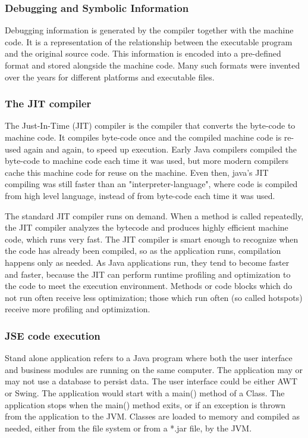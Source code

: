 \documentclass{article}
\begin{document}
\subsubsection{Debugging and Symbolic Information}

Debugging information is generated by the compiler together with the machine code. It is a representation of the relationship between the executable program and the original source code. This information is encoded into a pre-defined format and stored alongside the machine code. Many such formats were invented over the years for different platforms and executable files.

\subsubsection{The JIT compiler}

The Just-In-Time (JIT) compiler is the compiler that converts the byte-code to machine code. It compiles byte-code once and the compiled machine code is re-used again and again, to speed up execution. Early Java compilers compiled the byte-code to machine code each time it was used, but more modern compilers cache this machine code for reuse on the machine. Even then, java's JIT compiling was still faster than an "interpreter-language", where code is compiled from high level language, instead of from byte-code each time it was used.

The standard JIT compiler runs on demand. When a method is called repeatedly, the JIT compiler analyzes the bytecode and produces highly efficient machine code, which runs very fast. The JIT compiler is smart enough to recognize when the code has already been compiled, so as the application runs, compilation happens only as needed. As Java applications run, they tend to become faster and faster, because the JIT can perform runtime profiling and optimization to the code to meet the execution environment. Methods or code blocks which do not run often receive less optimization; those which run often (so called hotspots) receive more profiling and optimization.

\subsubsection{JSE code execution}

Stand alone application refers to a Java program where both the user interface and business modules are running on the same computer. The application may or may not use a database to persist data. The user interface could be either AWT or Swing.
The application would start with a main() method of a Class. The application stops when the main() method exits, or if an exception is thrown from the application to the JVM. Classes are loaded to memory and compiled as needed, either from the file system or from a *.jar file, by the JVM.
\end{document}
